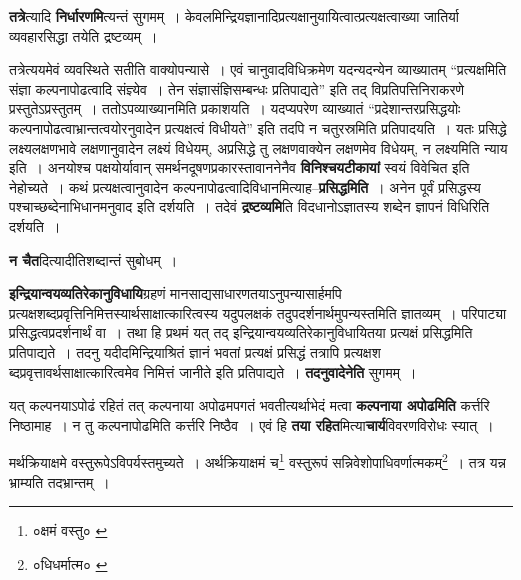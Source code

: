 \documentclass[article,12pt,a4paper]{memoir}
\begin{document}
	  \pstart \textbf{तत्रे}त्यादि \textbf{निर्धारणमि}त्यन्तं सुगमम् । केवलमिन्द्रियज्ञानादिप्रत्यक्षानुयायित्वात्प्रत्यक्षत्वाख्या जातिर्या व्यवहारसिद्धा तयेति द्रष्टव्यम् ।
	\pend
      

	  \pstart तत्रेत्ययमेवं व्यवस्थिते सतीति वाक्योपन्यासे । एवं चानुवादविधिक्रमेण यदन्यदन्येन व्याख्यातम् “प्रत्यक्षमिति संज्ञा कल्पनापोढत्वादि संज्ञ्येव । तेन संज्ञासंज्ञिसम्बन्धः प्रतिपाद्यते” इति तद् विप्रतिपत्तिनिराकरणे प्रस्तुतेऽप्रस्तुतम् । ततोऽपव्याख्यानमिति प्रकाशयति । यदप्यपरेण व्याख्यातं “प्रदेशान्तरप्रसिद्धयोः कल्पनापोढत्वाभ्रान्तत्वयोरनुवादेन प्रत्यक्षत्वं विधीयते” इति तदपि न चतुरस्रमिति प्रतिपादयति । यतः प्रसिद्धे लक्ष्यलक्षणभावे लक्षणानुवादेन लक्ष्यं विधेयम्, अप्रसिद्धे तु लक्षणवाक्येन लक्षणमेव विधेयम्, न लक्ष्यमिति न्याय इति । अनयोश्च पक्षयोर्यावान् समर्थनदूषणप्रकारस्तावाननेनैव \textbf{विनिश्चयटीकायां} स्वयं विवेचित इति नेहोच्यते । कथं प्रत्यक्षत्वानुवादेन कल्पनापोढत्वादिविधानमित्याह--\textbf{प्रसिद्धमिति} । अनेन पूर्वं प्रसिद्धस्य पश्चाच्छब्देनाभिधानमनुवाद इति दर्शयति । तदेवं \textbf{द्रष्टव्यमि}ति विदधानोऽज्ञातस्य शब्देन ज्ञापनं विधिरिति दर्शयति ।
	\pend
      

	  \pstart \textbf{न चैत}दित्यादीतिशब्दान्तं सुबोधम् ।
	\pend
      

	  \pstart \textbf{इन्द्रियान्वयव्यतिरेकानुविधायि}ग्रहणं मानसाद्यसाधारणतयाऽनुपन्यासार्हमपि प्रत्यक्षशब्दप्रवृत्तिनिमित्तस्यार्थसाक्षात्कारित्वस्य यदुपलक्षकं तदुपदर्शनार्थमुपन्यस्तमिति ज्ञातव्यम् । परिपाट्या प्रसिद्धत्वप्रदर्शनार्थं वा । तथा हि प्रथमं यत् तद् इन्द्रियान्वयव्यतिरेकानुविधायितया प्रत्यक्षं प्रसिद्धमिति प्रतिपाद्यते । तदनु यदीदमिन्द्रियाश्रितं ज्ञानं भवतां प्रत्यक्षं प्रसिद्धं तत्रापि प्रत्यक्षश \leavevmode{}ब्दप्रवृत्तावर्थसाक्षात्कारित्वमेव निमित्तं जानीते इति प्रतिपाद्यते । \textbf{तदनुवादेनेति} सुगमम् ।
	\pend
      

	  \pstart यत् कल्पनयाऽपोढं रहितं तत् कल्पनाया अपोढमपगतं भवतीत्यर्थाभेदं मत्वा \textbf{कल्पनाया अपोढमिति} कर्त्तरि निष्ठामाह । न तु कल्पनापोढमिति कर्त्तरि निष्ठैव । एवं हि \textbf{तया रहित}मित्या\textbf{चार्य}विवरणविरोधः स्यात् ।
	\pend
      \leavevmode{}
	  \bigskip
	  \begingroup
	

	  \pstart मर्थक्रियाक्षमे वस्तुरूपेऽविपर्यस्तमुच्यते । अर्थक्रियाक्षमं च\footnote{०क्षमं वस्तु० \cite{dp-msA} \cite{dp-edP} \cite{dp-edE}} वस्तुरूपं सन्निवेशोपाधिवर्णात्मकम्\footnote{०धिधर्मात्म० \cite{dp-edP} \cite{dp-edH}} । तत्र यन्न भ्राम्यति तदभ्रान्तम् ।
	\pend
      
	  \endgroup
	
\end{document}
